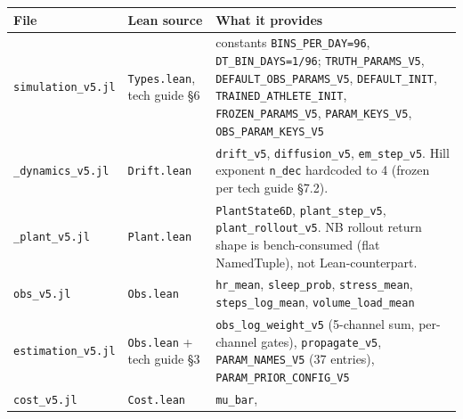 \documentclass[11pt,a4paper]{article}
\begin{document}
\begin{center}\footnotesize
\begin{tabular}{p{34mm}p{40mm}p{72mm}}
\toprule
File & Lean source & What it provides \\
\midrule
\texttt{simulation\_v5.jl}   & \texttt{Types.lean}, tech guide \S6
                              & constants \texttt{BINS\_PER\_DAY=96},
                                \texttt{DT\_BIN\_DAYS=1/96};
                                \texttt{TRUTH\_PARAMS\_V5},
                                \texttt{DEFAULT\_OBS\_PARAMS\_V5},
                                \texttt{DEFAULT\_INIT},
                                \texttt{TRAINED\_ATHLETE\_INIT},
                                \texttt{FROZEN\_PARAMS\_V5},
                                \texttt{PARAM\_KEYS\_V5},
                                \texttt{OBS\_PARAM\_KEYS\_V5} \\
\texttt{\_dynamics\_v5.jl}    & \texttt{Drift.lean}
                              & \texttt{drift\_v5}, \texttt{diffusion\_v5},
                                \texttt{em\_step\_v5}.
                                Hill exponent \texttt{n\_dec} hardcoded
                                to 4 (frozen per tech guide \S7.2). \\
\texttt{\_plant\_v5.jl}       & \texttt{Plant.lean}
                              & \texttt{PlantState6D},
                                \texttt{plant\_step\_v5},
                                \texttt{plant\_rollout\_v5}. NB
                                rollout return shape is
                                bench-consumed (flat NamedTuple),
                                not Lean-counterpart. \\
\texttt{obs\_v5.jl}            & \texttt{Obs.lean}
                              & \texttt{hr\_mean}, \texttt{sleep\_prob},
                                \texttt{stress\_mean},
                                \texttt{steps\_log\_mean},
                                \texttt{volume\_load\_mean} \\
\texttt{estimation\_v5.jl}    & \texttt{Obs.lean} + tech guide \S3
                              & \texttt{obs\_log\_weight\_v5}
                                (5-channel sum, per-channel gates),
                                \texttt{propagate\_v5},
                                \texttt{PARAM\_NAMES\_V5} (37 entries),
                                \texttt{PARAM\_PRIOR\_CONFIG\_V5} \\
\texttt{cost\_v5.jl}           & \texttt{Cost.lean}
                              & \texttt{mu\_bar},

\end{tabular}
\end{center}
\end{document}
